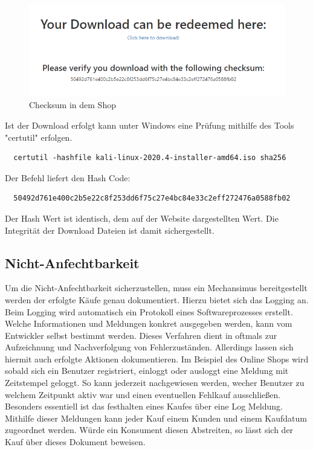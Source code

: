 \documentclass[utf8,biblatex]{lni}
\begin{document}
\begin{figure}
  \centering
  \includegraphics[width=\textwidth]{images/checksum_pic2.png}
  \caption[Checksum in dem Shop]{Checksum in dem Shop} 
  \label{checksum-pic2}
\end{figure} 

Ist der Download erfolgt kann unter Windows eine Prüfung mithilfe des Tools "certutil" erfolgen. 

\begin{verbatim}
  certutil -hashfile kali-linux-2020.4-installer-amd64.iso sha256
\end{verbatim}

Der Befehl liefert den Hash Code: 

\begin{verbatim}
  50492d761e400c2b5e22c8f253dd6f75c27e4bc84e33c2eff272476a0588fb02
\end{verbatim}

Der Hash Wert ist identisch, dem auf der Website dargestellten Wert. 
Die Integrität der Download Dateien ist damit sichergestellt. 

\subsection{Nicht-Anfechtbarkeit}

Um die Nicht-Anfechtbarkeit sicherzustellen, muss ein Mechansimus bereitgestellt werden der erfolgte Käufe genau dokumentiert. Hierzu bietet sich das Logging an. Beim Logging wird automatisch ein Protokoll
eines Softwareprozesses erstellt. Welche Informationen und Meldungen konkret ausgegeben werden, kann vom Entwickler selbst bestimmt werden. Dieses Verfahren dient in oftmals zur Aufzeichnung und Nachverfolgung
von Fehlerzuständen. Allerdings lassen sich hiermit auch erfolgte Aktionen dokumentieren. Im Beispiel des Online Shops wird sobald sich ein Benutzer registriert, einloggt oder ausloggt eine Meldung mit Zeitstempel geloggt.
So kann jederzeit nachgewiesen werden, wecher Benutzer zu welchem Zeitpunkt aktiv war und einen eventuellen Fehlkauf ausschließen. Besonders essentiell ist das festhalten eines Kaufes über eine Log Meldung. Mithilfe
dieser Meldungen kann jeder Kauf einem Kunden und einem Kaufdatum zugeordnet werden. Würde ein Konsument diesen Abstreiten, so lässt sich der Kauf über dieses Dokument beweisen. 
\end{document}
